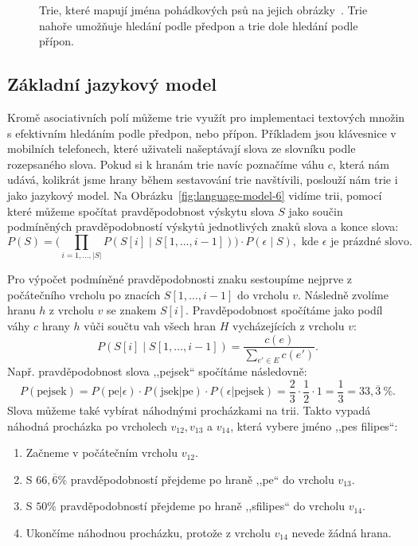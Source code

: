 \documentclass{csbulletin}
\begin{document}
\begin{figure}
\centering

\caption{Trie, které mapují jména pohádkových psů na jejich obrázky~\cite{hannabarbera2023huckleberry, capek1972povidani, gogen2023gogen}. Trie nahoře umožňuje hledání podle předpon a trie dole hledání podle přípon.}
\label{fig:trie}
\bigskip

\end{figure}

\subsection{Základní jazykový model}
Kromě asociativních polí můžeme trie využít pro implementaci textových množin s efektivním hledáním podle předpon, nebo přípon. Příkladem jsou klávesnice v mobilních telefonech, které uživateli našeptávají slova ze slovníku podle rozepsaného slova. Pokud si k hranám trie navíc poznačíme váhu $c$, která nám udává, kolikrát jsme hrany během sestavování trie navštívili, poslouží nám trie i jako jazykový model. Na Obrázku~\ref{fig:language-model-6} vidíme trii, pomocí které můžeme spočítat pravděpodobnost výskytu slova $S$ jako součin podmíněných pravděpodobností výskytů jednotlivých znaků slova a konce slova:
\begin{equation}
P(S) = \big(  \!\!\! \!\!\! \prod_{i = 1,\ldots,|S|} \!\!\!\! P(S[i]\mid S[1, \ldots, i-1]) \big)\cdot P(\epsilon\mid S),
\text{ kde $\epsilon$ je prázdné slovo.}
\end{equation}

Pro výpočet podmíněné pravděpodobnosti znaku sestoupíme nejprve z počátečního vrcholu po znacích $S[1, \ldots, i-1]$ do vrcholu $v$. Následně zvolíme hranu $h$ z vrcholu $v$ se znakem $S[i]$. Pravděpodobnost spočítáme jako podíl váhy $c$ hrany $h$ vůči součtu vah všech hran $H$ vycházejících z vrcholu $v$:
\begin{equation}
P(S[i]\mid S[1, \ldots, i-1]) = \frac{c(e)}{\sum_{e'\in E} c(e')}.
\end{equation}
Např. pravděpodobnost slova ,,pejsek`` spočítáme následovně:
\begin{equation}
P(\text{pejsek}) = P(\text{pe}|\epsilon) \cdot P(\text{jsek}|\text{pe}) \cdot P(\epsilon|\text{pejsek}) = \frac23\cdot \frac12\cdot 1 = \frac13 = 33{,}\overline3\ \%.
\end{equation}
Slova můžeme také vybírat náhodnými procházkami na trii. Takto vypadá náhodná procházka po vrcholech $v_{12}, v_{13}$ a $v_{14}$, která vybere jméno ,,pes filipes``:
\begin{enumerate}
\item Začneme v počátečním vrcholu $v_{12}$.
\item S $66{,}\overline6\%$ pravděpodobností přejdeme po hraně ,,pe`` do vrcholu $v_{13}$.
\item S $50\%$ pravděpodobností přejdeme po hraně ,,s\textvisiblespace filipes`` do vrcholu $v_{14}$.
\item Ukončíme náhodnou procházku, protože z vrcholu $v_{14}$ nevede žádná hrana.
\end{enumerate}
\end{document}
